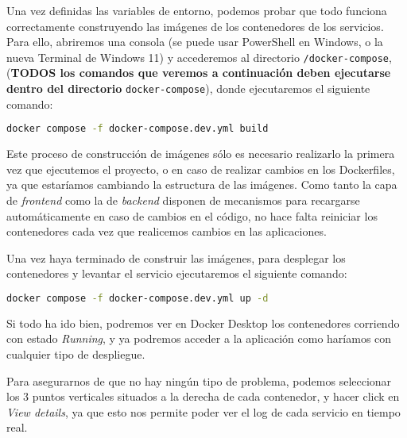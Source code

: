 Una vez definidas las variables de entorno, podemos probar que todo funciona correctamente construyendo las imágenes de los contenedores de los servicios. Para ello, abriremos una consola (se puede usar PowerShell en Windows, o la nueva Terminal de Windows 11) y accederemos al directorio \verb,/docker-compose,, (\textbf{TODOS los comandos que veremos a continuación deben ejecutarse dentro del directorio} \verb,docker-compose,), donde ejecutaremos el siguiente comando:

\begin{lstlisting}[language=Bash]
docker compose -f docker-compose.dev.yml build
\end{lstlisting}


Este proceso de construcción de imágenes sólo es necesario realizarlo la primera vez que ejecutemos el proyecto, o en caso de realizar cambios en los Dockerfiles, ya que estaríamos cambiando la estructura de las imágenes. Como tanto la capa de \textit{frontend} como la de \textit{backend} disponen de mecanismos para recargarse automáticamente en caso de cambios en el código, no hace falta reiniciar los contenedores cada vez que realicemos cambios en las aplicaciones.

Una vez haya terminado de construir las imágenes, para desplegar los contenedores y levantar el servicio ejecutaremos el siguiente comando:

\begin{lstlisting}[language=Bash]
docker compose -f docker-compose.dev.yml up -d
\end{lstlisting}


Si todo ha ido bien, podremos ver en Docker Desktop los contenedores corriendo con estado \textit{Running}, y ya podremos acceder a la aplicación como haríamos con cualquier tipo de despliegue. 


Para asegurarnos de que no hay ningún tipo de problema, podemos seleccionar los 3 puntos verticales situados a la derecha de cada contenedor, y hacer click en \textit{View details}, ya que esto nos permite poder ver el log de cada servicio en tiempo real. 


